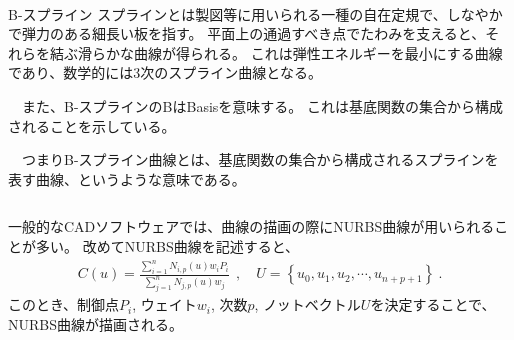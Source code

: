 ~\vfill
\begin{Column}{B-スプライン}
スプラインとは製図等に用いられる一種の自在定規で、しなやかで弾力のある細長い板を指す。
平面上の通過すべき点でたわみを支えると、それらを結ぶ滑らかな曲線が得られる。
これは弾性エネルギーを最小にする曲線であり、数学的には3次のスプライン曲線となる。

　また、B-スプラインのBはBasisを意味する。
これは基底関数の集合から構成されることを示している。

　つまりB-スプライン曲線とは、基底関数の集合から構成されるスプラインを表す曲線、というような意味である。
\end{Column}



\clearpage
一般的なCADソフトウェアでは、曲線の描画の際にNURBS曲線が用いられることが多い。
改めてNURBS曲線を記述すると、
\begin{align*}
  C(u) = \frac{\displaystyle\sum_{i=1}^nN_{i, p}(u)w_iP_i}{\displaystyle\sum_{j=1}^nN_{j, p}(u)w_j}~~,\quad
  U = \left\{u_0, u_1, u_2, \cdots, u_{n+p+1}\right\}\ .
\end{align*}
このとき、制御点$P_i$, ウェイト$w_i$, 次数$p$, ノットベクトル$U$を決定することで、NURBS曲線が描画される。


